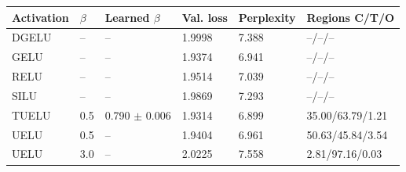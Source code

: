 \begin{tabular}{llllll}
\toprule
Activation & $\beta$ & Learned $\beta$ & Val. loss & Perplexity & Regions C/T/O \\
\midrule
DGELU & -- & -- & 1.9998 & 7.388 & --/--/-- \\
GELU & -- & -- & 1.9374 & 6.941 & --/--/-- \\
RELU & -- & -- & 1.9514 & 7.039 & --/--/-- \\
SILU & -- & -- & 1.9869 & 7.293 & --/--/-- \\
TUELU & 0.5 & 0.790 $\pm$ 0.006 & 1.9314 & 6.899 & 35.00/63.79/1.21 \\
UELU & 0.5 & -- & 1.9404 & 6.961 & 50.63/45.84/3.54 \\
UELU & 3.0 & -- & 2.0225 & 7.558 & 2.81/97.16/0.03 \\
\bottomrule
\end{tabular}
